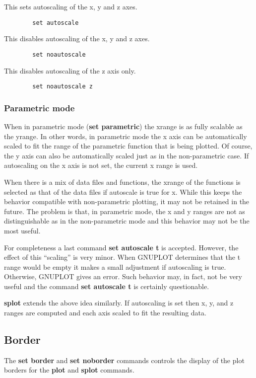 This sets autoscaling of the x, y and z axes.
\begin{verbatim}
        set autoscale
\end{verbatim}

This disables autoscaling of the x, y and z axes.
\begin{verbatim}
        set noautoscale
\end{verbatim}

This disables autoscaling of the z axis only.
\begin{verbatim}
        set noautoscale z
\end{verbatim}
\subsubsection{Parametric mode}
When in parametric mode ({\bf set parametric}) the xrange is as
fully scalable as the yrange. In other words, in parametric
mode the x axis can be automatically scaled to fit the range
of the parametric function that is being plotted. Of course,
the y axis can also be automatically scaled just as in the
non-parametric case. If autoscaling on the x axis is not set,
the current x range is used.

When there is a mix of data files and functions, the xrange of
the functions is selected as that of the data files if autoscale
is true for x. While this keeps the behavior compatible with
non-parametric plotting, it may not be retained in the future.
The problem is that, in parametric mode, the x and y ranges are
not as distinguishable as in the non-parametric mode and this
behavior may not be the most useful.

For completeness a last command {\bf set autoscale t} is accepted.
However, the effect of this ``scaling'' is very minor. When
GNUPLOT determines that the t range would be empty it makes a
small adjustment if autoscaling is true. Otherwise, GNUPLOT
gives an error. Such behavior may, in fact, not be very useful
and the command {\bf set autoscale t} is certainly questionable.

{\bf splot} extends the above idea similarly. If autoscaling is set then
x, y, and z ranges are computed and each axis scaled to fit the
resulting data.
\subsection{Border}
The {\bf set border} and {\bf set noborder} commands controls the display of
the plot borders for the {\bf plot} and {\bf splot} commands.

